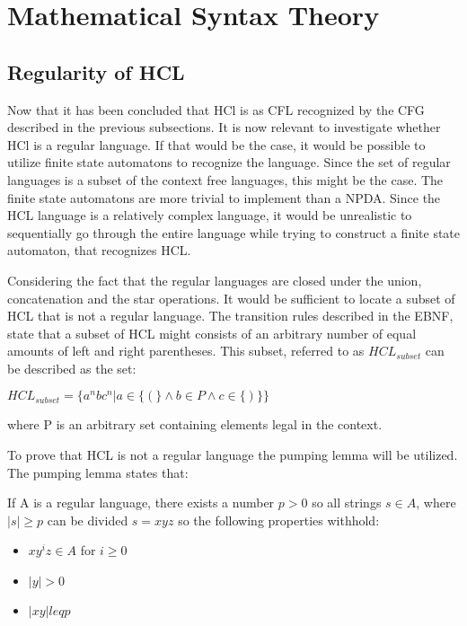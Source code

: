 \section{Mathematical Syntax Theory}

\subsection{Regularity of HCL}
Now that it has been concluded that HCl is as CFL recognized by the CFG described in the previous subsections.
It is now relevant to investigate whether HCl is a regular language. If that would be the case, it would be possible to utilize finite state automatons to recognize the language.
Since the set of regular languages is a subset of the context free languages, this might be the case.
The finite state automatons are more trivial to implement than a NPDA. 
Since the HCL language is a relatively complex language, it would be unrealistic to sequentially go through the entire language while trying to construct a finite state automaton, that recognizes HCL.

Considering the fact that the regular languages are closed under the union, concatenation and the star operations. 
It would be sufficient to locate a subset of HCL that is not a regular language.
The transition rules described in the EBNF, state that a subset of HCL might consists of an arbitrary number of equal amounts of left and right parentheses.
This subset, referred to as $HCL_{subset}$ can be described as the set:
\begin{center}
	$HCL_{subset} = \{a^nbc^n | a \in \{(\} \wedge b \in P \wedge c \in \{)\}\}$
\end{center}

where P is an arbitrary set containing elements legal in the context.

To prove that HCL is not a regular language the pumping lemma will be utilized.
The pumping lemma states that:
\begin{center}
	If A is a regular language, there exists a number $p>0$ so all strings $s \in A $, where $|s| \geq p$ can be divided $s = xyz$ so the following properties withhold:
	\begin{itemize}
		\item $xy^iz \in A$ for $i \geq 0$
		\item $|y| > 0$
		\item $|xy| leq p$
	\end{itemize}
\end{center}


